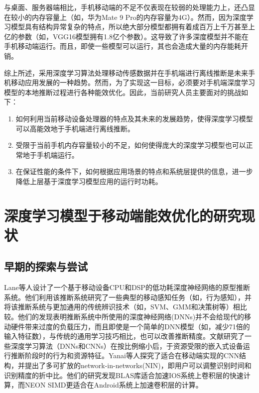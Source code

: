与桌面、服务器端相比，手机移动端的不足不仅表现在较弱的处理能力上，还凸显在较小的内存容量上（如，华为Mate 9 Pro的内存容量为4G）。然而，因为深度学习模型具有结构异常复杂的特点，所以绝大部分模型都拥有着成百万上千万甚至上亿的参数（如，VGG16\cite{simonyan2014very}模型拥有1.8亿个参数）。这导致了许多深度模型并不能在手机移动端运行。而且，即使一些模型可以运行，其也会造成大量的内存能耗开销。

综上所述，采用深度学习算法处理移动传感数据并在手机端进行离线推断是未来手机移动应用发展的一种趋势。然而，为了实现这一目标，必须要对手机端深度学习模型的本地推断过程进行各种能效优化。因此，当前研究人员主要面对的挑战如下：

\begin{enumerate}
\item  如何利用当前移动设备处理器的特点及其未来的发展趋势，使得深度学习模型可以高能效地于手机端进行离线推断。
\item 受限于当前手机内存容量较小的不足，如何使得庞大的深度学习模型也可以正常地于手机端运行。
\item 在保证性能的条件下，如何根据应用场景的特点和系统层提供的信息，进一步降低上层基于深度学习模型应用的运行时功耗。
\end{enumerate}

\section{深度学习模型于移动端能效优化的研究现状}
\subsection{早期的探索与尝试}
Lane等人\cite{lane2015can}设计了一个基于移动设备CPU和DSP的低功耗深度神经网络的原型推断系统。他们利用该推断系统研究了一些典型的移动感知任务（如，行为感知），并将该推断系统与更加通用的传统辨识技术（如，SVM、GMM和决策树等）相比较。他们的发现表明推断系统中所使用的深度神经网络(DNNs)并不会给现代的移动硬件带来过度的负载压力，而且即使是一个简单的DNN模型（如，减少71倍的输入特征数），与传统的通用学习技巧相比，也可以改善推断精度。文献\cite{lane2015early}研究了一些深度学习算法（DNNs和CNNs）在按比例缩小后，于资源受限的嵌入式设备运行推断阶段时的行为和资源特征。Yanai等人\cite{yanai2016efficient}探究了适合在移动端实现的CNN结构，并提出了多可扩放的network-in-networks(NIN)，即用户可以调整识别时间和识别精度的折中比。他们的研究发现BLAS库适合加速IOS系统上卷积层的快速计算，而NEON SIMD更适合在Android系统上加速卷积层的计算。
